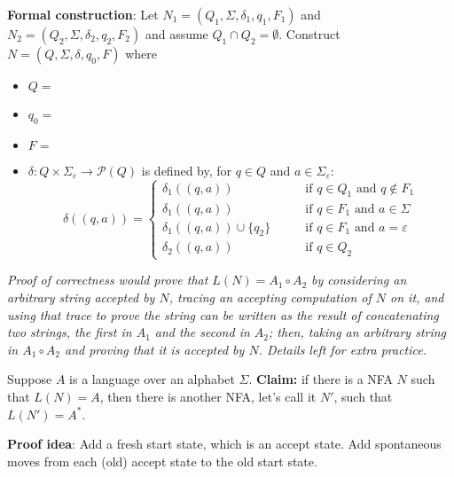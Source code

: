 \documentclass[12pt, oneside]{article}
\begin{document}
{\bf Formal construction}: Let 
$N_1 = (Q_1, \Sigma, \delta_1, q_1, F_1)$ and $N_2 = (Q_2, \Sigma, \delta_2,q_2, F_2)$
and assume $Q_1 \cap Q_2 = \emptyset$.
Construct $N = (Q, \Sigma, \delta, q_0, F)$ where
\begin{itemize}
    \item $Q = $
    \item $q_0 = $
    \item $F = $
    \item $\delta: Q \times \Sigma_\varepsilon \to \mathcal{P}(Q)$ is defined by, for $q \in Q$ and $a \in \Sigma_{\varepsilon}$:
        \[
            \delta((q,a))=\begin{cases}  
                \delta_1 ((q,a)) &\qquad\text{if } q\in Q_1 \textrm{ and } q \notin F_1\\ 
                \delta_1 ((q,a)) &\qquad\text{if } q\in F_1 \textrm{ and } a \in \Sigma\\ 
                \delta_1 ((q,a)) \cup \{q_2\} &\qquad\text{if } q\in F_1 \textrm{ and } a = \varepsilon\\ 
                \delta_2 ((q,a)) &\qquad\text{if } q\in Q_2
            \end{cases}
        \]
\end{itemize}

\vfill

{\it Proof of correctness would prove that $L(N) = A_1 \circ A_2$ by considering
an arbitrary string accepted by $N$, tracing an accepting computation of $N$ on it, and using 
that trace to prove the string can be written as the result of concatenating two strings, 
the first in $A_1$ and the second in $A_2$; then, taking an arbitrary 
string in $A_1 \circ A_2$ and proving that it is accepted by $N$. Details left for extra practice.}

\newpage

Suppose $A$ is a language over an alphabet $\Sigma$.
{\bf Claim:} if there is a NFA $N$ such that $L(N) = A$, then there is another NFA, let's call it $N'$, such that 
$L(N') = A^*$.

{\bf Proof idea}: Add a fresh start state, which is an accept state. Add spontaneous 
moves from each (old) accept state to the old start state.
\end{document}
